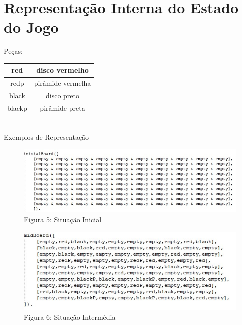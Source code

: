 \documentclass[11pt]{article}
\begin{document}
\newpage
\thispagestyle{fancy}
\fancyhf{}
\fancyfoot[R]{\thepage}
\renewcommand*{\footrulewidth}{1pt}


\section*{Representação Interna do Estado do Jogo}
\begin{center}
Peças:\\
\begin{tabular}{|c|c|}
    \hline
    red  & disco vermelho \\
    \hline
    redp & pirâmide vermelha \\
    \hline
    black & disco preto \\
    \hline
    blackp & pirâmide preta \\
    \hline
\end{tabular} \\
\vspace{1cm}
Exemplos de Representação

\begin{figure}[h]
\begin{center}
\includegraphics[scale=0.7]{fig5.jpg}
\caption*{Figura 5: Situação Inicial}
\end{center}
\end{figure}

\begin{figure}[h]
\begin{center}
\includegraphics[scale=0.7]{fig6.jpg}
\caption*{Figura 6: Situação Intermédia}
\end{center}
\end{figure}


\end{center}
\end{document}
